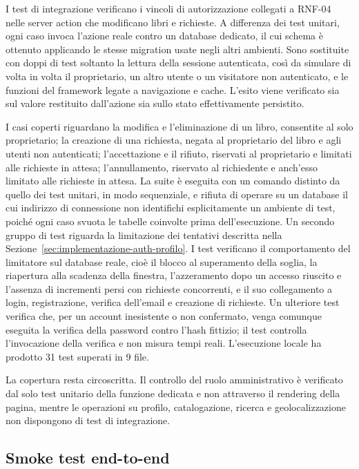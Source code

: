 I test di integrazione verificano i vincoli di autorizzazione collegati a RNF-04 nelle server action che modificano libri e richieste. A differenza dei test unitari, ogni caso invoca l'azione reale contro un database \postgresql{} dedicato, il cui schema è ottenuto applicando le stesse migration \prisma{} usate negli altri ambienti. Sono sostituite con doppi di test soltanto la lettura della sessione autenticata, così da simulare di volta in volta il proprietario, un altro utente o un visitatore non autenticato, e le funzioni del framework \nextjs{} legate a navigazione e cache. L'esito viene verificato sia sul valore restituito dall'azione sia sullo stato effettivamente persistito.

I casi coperti riguardano la modifica e l'eliminazione di un libro, consentite al solo proprietario; la creazione di una richiesta, negata al proprietario del libro e agli utenti non autenticati; l'accettazione e il rifiuto, riservati al proprietario e limitati alle richieste in attesa; l'annullamento, riservato al richiedente e anch'esso limitato alle richieste in attesa. La suite è eseguita con un comando distinto da quello dei test unitari, in modo sequenziale, e rifiuta di operare su un database il cui indirizzo di connessione non identifichi esplicitamente un ambiente di test, poiché ogni caso svuota le tabelle coinvolte prima dell'esecuzione. Un secondo gruppo di test riguarda la limitazione dei tentativi descritta nella Sezione~\ref{sec:implementazione-auth-profilo}. I test verificano il comportamento del limitatore sul database reale, cioè il blocco al superamento della soglia, la riapertura alla scadenza della finestra, l'azzeramento dopo un accesso riuscito e l'assenza di incrementi persi con richieste concorrenti, e il suo collegamento a login, registrazione, verifica dell'email e creazione di richieste. Un ulteriore test verifica che, per un account inesistente o non confermato, venga comunque eseguita la verifica della password contro l'hash fittizio; il test controlla l'invocazione della verifica e non misura tempi reali. L'esecuzione locale ha prodotto 31 test superati in 9 file.

La copertura resta circoscritta. Il controllo del ruolo amministrativo è verificato dal solo test unitario della funzione dedicata e non attraverso il rendering della pagina, mentre le operazioni su profilo, catalogazione, ricerca e geolocalizzazione non dispongono di test di integrazione.

\subsection{Smoke test end-to-end}
\label{subsec:e2e-smoke}

